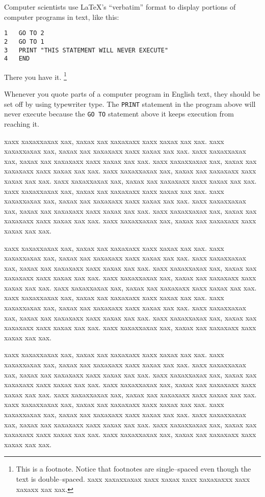 Computer scientists use LaTeX's ``verbatim'' format to display portions 
of computer programs in text, like this:
\begin{verbatim}
1   GO TO 2
2   GO TO 1
3   PRINT "THIS STATEMENT WILL NEVER EXECUTE"
4   END
\end{verbatim}
There you have it.%
\footnote{This is a footnote. Notice that footnotes are single--spaced 
even though the text is double--spaced. xaxx xaxaxxaxax xaxx xaxax xaxx
xaxaxaxxx xaxx xaxaxx xax xax.}

Whenever you quote parts of a computer program in English text, they 
should be set off by using typewriter type.  The {\tt PRINT} statement 
in the program above will never execute because the {\tt GO TO} 
statement above it keeps execution from reaching it.


xaxx xaxaxxaxax xax, xaxax xax xaxaxaxx xaxx xaxax xax xax.
xaxx xaxaxxaxax xax, xaxax xax xaxaxaxx xaxx xaxax xax xax.
xaxx xaxaxxaxax xax, xaxax xax xaxaxaxx xaxx xaxax xax xax.
xaxx xaxaxxaxax xax, xaxax xax xaxaxaxx xaxx xaxax xax xax.
xaxx xaxaxxaxax xax, xaxax xax xaxaxaxx xaxx xaxax xax xax.
xaxx xaxaxxaxax xax, xaxax xax xaxaxaxx xaxx xaxax xax xax.
xaxx xaxaxxaxax xax, xaxax xax xaxaxaxx xaxx xaxax xax xax.
xaxx xaxaxxaxax xax, xaxax xax xaxaxaxx xaxx xaxax xax xax.
xaxx xaxaxxaxax xax, xaxax xax xaxaxaxx xaxx xaxax xax xax.
xaxx xaxaxxaxax xax, xaxax xax xaxaxaxx xaxx xaxax xax xax.
xaxx xaxaxxaxax xax, xaxax xax xaxaxaxx xaxx xaxax xax xax.

xaxx xaxaxxaxax xax, xaxax xax xaxaxaxx xaxx xaxax xax xax.
xaxx xaxaxxaxax xax, xaxax xax xaxaxaxx xaxx xaxax xax xax.
xaxx xaxaxxaxax xax, xaxax xax xaxaxaxx xaxx xaxax xax xax.
xaxx xaxaxxaxax xax, xaxax xax xaxaxaxx xaxx xaxax xax xax.
xaxx xaxaxxaxax xax, xaxax xax xaxaxaxx xaxx xaxax xax xax.
xaxx xaxaxxaxax xax, xaxax xax xaxaxaxx xaxx xaxax xax xax.
xaxx xaxaxxaxax xax, xaxax xax xaxaxaxx xaxx xaxax xax xax.
xaxx xaxaxxaxax xax, xaxax xax xaxaxaxx xaxx xaxax xax xax.
xaxx xaxaxxaxax xax, xaxax xax xaxaxaxx xaxx xaxax xax xax.
xaxx xaxaxxaxax xax, xaxax xax xaxaxaxx xaxx xaxax xax xax.
xaxx xaxaxxaxax xax, xaxax xax xaxaxaxx xaxx xaxax xax xax.

xaxx xaxaxxaxax xax, xaxax xax xaxaxaxx xaxx xaxax xax xax.
xaxx xaxaxxaxax xax, xaxax xax xaxaxaxx xaxx xaxax xax xax.
xaxx xaxaxxaxax xax, xaxax xax xaxaxaxx xaxx xaxax xax xax.
xaxx xaxaxxaxax xax, xaxax xax xaxaxaxx xaxx xaxax xax xax.
xaxx xaxaxxaxax xax, xaxax xax xaxaxaxx xaxx xaxax xax xax.
xaxx xaxaxxaxax xax, xaxax xax xaxaxaxx xaxx xaxax xax xax.
xaxx xaxaxxaxax xax, xaxax xax xaxaxaxx xaxx xaxax xax xax.
xaxx xaxaxxaxax xax, xaxax xax xaxaxaxx xaxx xaxax xax xax.
xaxx xaxaxxaxax xax, xaxax xax xaxaxaxx xaxx xaxax xax xax.
xaxx xaxaxxaxax xax, xaxax xax xaxaxaxx xaxx xaxax xax xax.
xaxx xaxaxxaxax xax, xaxax xax xaxaxaxx xaxx xaxax xax xax.

